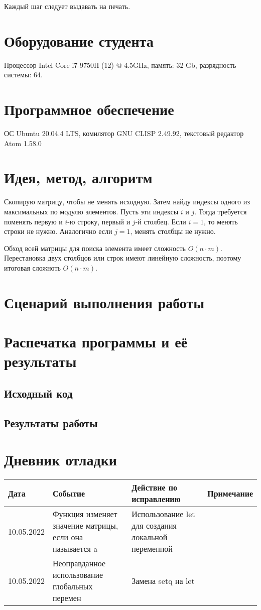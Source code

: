 \documentclass[12pt]{article}
\begin{document}
Каждый шаг следует выдавать на печать.

\section{Оборудование студента}
Процессор Intel Core i7-9750H (12) @ 4.5GHz, память: 32 Gb, разрядность системы: 64.

\section{Программное обеспечение}
ОС Ubuntu 20.04.4 LTS, комилятор GNU CLISP 2.49.92, текстовый редактор Atom 1.58.0

\pagebreak
\section{Идея, метод, алгоритм}
Скопирую матрицу, чтобы не менять исходную. Затем найду индексы одного из максимальных по модулю элементов. Пусть эти индексы $i$ и $j$. Тогда требуется поменять первую и $i$-ю строку, первый и $j$-й столбец. Если $i = 1$, то менять строки не нужно. Аналогично если $j = 1$, менять столбцы не нужно.

Обход всей матрицы для поиска элемента имеет сложность $O(n \cdot m)$. Перестановка двух столбцов или строк имеют линейную сложность, поэтому итоговая сложноть $O(n \cdot m)$.

\section{Сценарий выполнения работы}

\section{Распечатка программы и её результаты}

\subsection{Исходный код}


\pagebreak
\subsection{Результаты работы}


\pagebreak
\section{Дневник отладки}
\begin{tabular}{|p{50pt}|p{140pt}|p{140pt}|p{80pt}|}
\hline
Дата & Событие & Действие по исправлению & Примечание \\
\hline
10.05.2022 & Функция изменяет значение матрицы, если она называется a & Использование let для создания локальной переменной & \\
\hline
10.05.2022 & Неоправданное использование глобальных перемен & Замена setq на let & \\
\hline
\end{tabular}
\end{document}

